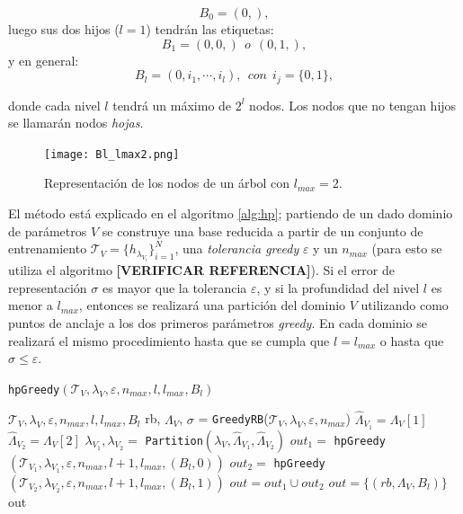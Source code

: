 \[
B_0 = (0,),
\]
luego sus dos hijos ($l=1$) tendrán las etiquetas:
\[
B_1 = (0,0,) \ \ o \ \  (0, 1, ),
\]
y en general:
\[
B_l = (0, i_1, \cdots, i_l), \ \  con \ \ i_j = \{0, 1\},
\]

\noindent donde cada nivel $l$ tendrá un máximo de $2^l$ nodos.
Los nodos que no tengan hijos se llamarán nodos \textit{hojas}.
\begin{figure}[h!]
\centering
\texttt{[image: Bl\_lmax2.png]}
\caption{Representación de los nodos de un árbol con $l_{max}=2$.}
\end{figure}

El método está explicado en el algoritmo \ref{alg:hp}; partiendo de un dado dominio de parámetros $V$ se construye una base reducida a partir de un conjunto de entrenamiento $\mathcal{T}_V = \{h_{\lambda_{V_i}}\}_{i=1}^{N}$, una \textit{tolerancia greedy} $\varepsilon$ y un $n_{max}$ (para esto se utiliza el algoritmo \textbf{[VERIFICAR REFERENCIA]}). Si el error de representación $\sigma$ es mayor que la tolerancia $\varepsilon$, y si la profundidad del nivel $l$ es menor a $l_{max}$, entonces se realizará una partición del dominio $V$ utilizando como puntos de anclaje a los dos primeros parámetros \textit{greedy}. En cada dominio se realizará el mismo procedimiento hasta que se cumpla que $l = l_{max}$ o hasta que $\sigma \le \varepsilon$.


\begin{algorithm}
\caption{\texttt{hpGreedy}\((\mathcal{T}_V, \lambda_V, \varepsilon, n_{max}, l, l_{max}, B_{l})\)}\label{alg:hp}
\begin{algorithmic}[1]
\Require $\mathcal{T}_V, \lambda_V, \varepsilon, n_{max}, l, l_{max}, B_{l}$ 
\vspace{3mm}
\State rb, $\Lambda_V$, $\sigma$ = \texttt{GreedyRB}($\mathcal{T}_V,\lambda_V, \varepsilon, n_{max}$) 
\vspace{3mm}
	\State $\hat{\Lambda}_{V_1} = \Lambda_V[1]$
	\State $\hat{\Lambda}_{V_2} = \Lambda_V[2]$
	\State $\lambda_{V_1}, \lambda_{V_2} =$ \texttt{Partition}$(\lambda_V,\hat{\Lambda}_{V_1}, \hat{\Lambda}_{V_2})$
	\State $out_1 = $ \texttt{hpGreedy}\((\mathcal{T}_{V_1}, \lambda_{V_1}, \varepsilon, n_{max}, l+1, l_{max}, (B_{l}, 0))\)
	\State $out_2 = $ \texttt{hpGreedy}\((\mathcal{T}_{V_2} ,\lambda_{V_2}, \varepsilon, n_{max}, l+1, l_{max}, (B_{l}, 1))\)
	\State $out = out_1 \cup out_2$
\Else
	\State $out = \{( rb, \Lambda_V, B_l)\}$
\EndIf
\vspace{3mm}
\Ensure out
\end{algorithmic}
\end{algorithm}


